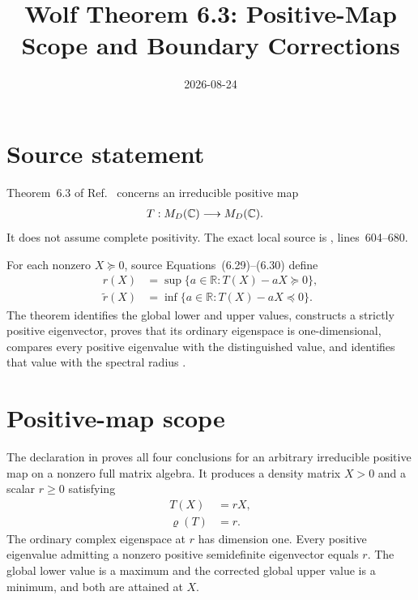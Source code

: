 \documentclass[11pt]{article}
\title{Wolf Theorem 6.3: Positive-Map Scope and Boundary Corrections}
\author{}
\date{2026-08-24}
\begin{document}
\maketitle
{}

\section{Source statement}

Theorem~6.3 of Ref.~\cite{Wolf2012Quantum} concerns an irreducible positive
map
\begin{align}
  T
    &:M_{D}(\mathbb{C})\longrightarrow M_{D}(\mathbb{C}).
  \label{eq:wolf_thm6_3_positive_map_cp_scope_positive_map}
\end{align}
It does not assume complete positivity. The exact local source is
,
lines~604--680.

For each nonzero $X\succeq0$, source Equations~(6.29)--(6.30) define
\begin{align}
  r(X)
    &=\sup\{a\in\mathbb R:T(X)-aX\succeq0\},
  \label{eq:wolf_thm6_3_positive_map_cp_scope_lower_functional}\\
  \widetilde r(X)
    &=\inf\{a\in\mathbb R:T(X)-aX\preceq0\}.
  \label{eq:wolf_thm6_3_positive_map_cp_scope_upper_functional}
\end{align}
The theorem identifies the global lower and upper values, constructs a
strictly positive eigenvector, proves that its ordinary eigenspace is
one-dimensional, compares every positive eigenvalue with the distinguished
value, and identifies that value with the spectral radius
\cite[Theorem~6.3]{Wolf2012Quantum}.

\section{Positive-map scope}

The declaration
 in
 proves all four conclusions
for an arbitrary irreducible positive map on a nonzero full matrix algebra. It
produces a density matrix $X>0$ and a scalar $r\geq0$ satisfying
\begin{align}
  T(X)
    &=rX,
  \label{eq:wolf_thm6_3_positive_map_cp_scope_perron_eigenvector}\\
  \varrho(T)
    &=r.
  \label{eq:wolf_thm6_3_positive_map_cp_scope_spectral_radius}
\end{align}
The ordinary complex eigenspace at $r$ has dimension one. Every positive
eigenvalue admitting a nonzero positive semidefinite eigenvector equals $r$.
The global lower value is a maximum and the corrected global upper value is a
minimum, and both are attained at $X$.
\end{document}

